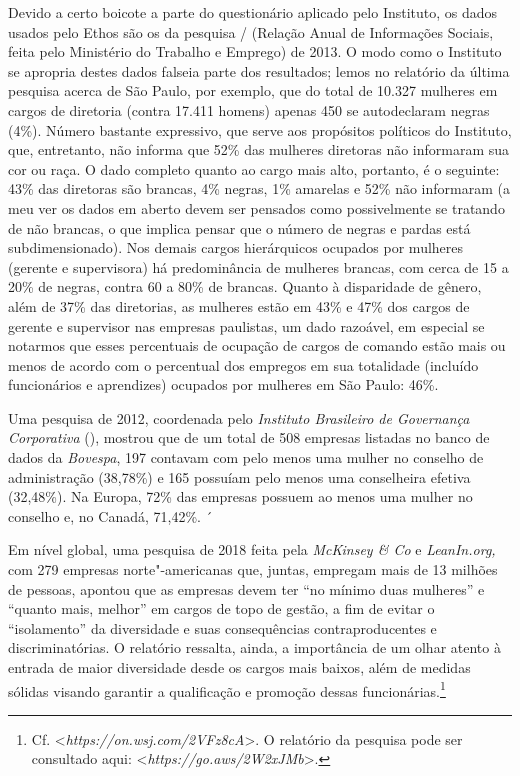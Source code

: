 Devido a certo boicote a parte do questionário aplicado pelo Instituto,
os dados usados pelo Ethos são os da pesquisa / (Relação Anual de
Informações Sociais, feita pelo Ministério do Trabalho e Emprego) de
2013. O modo como o Instituto se apropria destes dados falseia parte dos
resultados; lemos no relatório da última pesquisa acerca de São Paulo,
por exemplo, que do total de 10.327 mulheres em cargos de diretoria
(contra 17.411 homens) apenas 450 se autodeclaram negras (4\%). Número
bastante expressivo, que serve aos propósitos políticos do Instituto,
que, entretanto, não informa que 52\% das mulheres diretoras não
informaram sua cor ou raça. O dado completo quanto ao cargo mais alto,
portanto, é o seguinte: 43\% das diretoras são brancas, 4\% negras, 1\%
amarelas e 52\% não informaram (a meu ver os dados em aberto devem ser
pensados como possivelmente se tratando de não brancas, o que implica
pensar que o número de negras e pardas está subdimensionado). Nos demais
cargos hierárquicos ocupados por mulheres (gerente e supervisora) há
predominância de mulheres brancas, com cerca de 15 a 20\% de negras,
contra 60 a 80\% de brancas. Quanto à disparidade de gênero, além de
37\% das diretorias, as mulheres estão em 43\% e 47\% dos cargos de
gerente e supervisor nas empresas paulistas, um dado razoável, em
especial se notarmos que esses percentuais de ocupação de cargos de
comando estão mais ou menos de acordo com o percentual dos empregos em
sua totalidade (incluído funcionários e aprendizes) ocupados por
mulheres em São Paulo: 46\%.

Uma pesquisa de 2012, coordenada pelo \emph{Instituto Brasileiro de
Governança Corporativa} (), mostrou que de um total de 508 empresas
listadas no banco de dados da \emph{ Bovespa}, 197 contavam com
pelo menos uma mulher no conselho de administração (38,78\%) e 165
possuíam pelo menos uma conselheira efetiva (32,48\%). Na Europa, 72\%
das empresas possuem ao menos uma mulher no conselho e, no Canadá,
71,42\%. ´

Em nível global, uma pesquisa de 2018 feita pela \emph{McKinsey \& Co} e
\emph{LeanIn.org,} com 279 empresas norte"-americanas que, juntas,
empregam mais de 13 milhões de pessoas, apontou que as empresas devem
ter ``no mínimo duas mulheres'' e ``quanto mais, melhor'' em cargos de
topo de gestão, a fim de evitar o ``isolamento'' da diversidade e suas
consequências contraproducentes e discriminatórias. O relatório
ressalta, ainda, a importância de um olhar atento à entrada de maior
diversidade desde os cargos mais baixos, além de medidas sólidas visando
garantir a qualificação e promoção dessas funcionárias.\footnote{Cf.
  \textless{}\emph{https://on.wsj.com/2VFz8cA}\textgreater{}.
  O relatório da pesquisa pode ser consultado aqui:
  \textless{}\emph{https://go.aws/2W2xJMb}\textgreater{}.}

